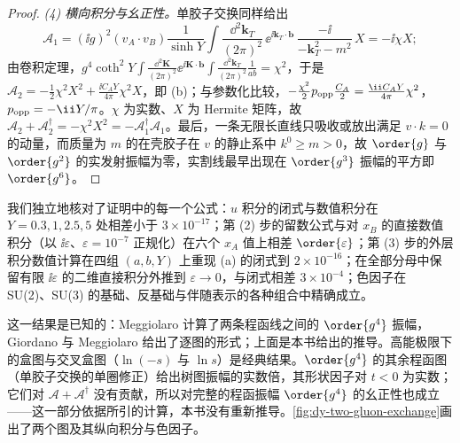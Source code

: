 \begin{proof}
\emph{(4) 横向积分与幺正性。}单胶子交换同样给出
\[
\mathcal A_1=(\ii g)^2(v_A\cdot v_B)\frac{1}{\sinh Y}\int\frac{\dd^2\mathbf k_T}{(2\pi)^2}\,\ee^{\ii\mathbf k_T\cdot\boldsymbol b}\,\frac{-\ii}{-\mathbf k_T^2-m^2}\,X=-\ii\chi X ;
\]
由卷积定理，$g^4\coth^2Y\int\frac{\dd^2\mathbf K}{(2\pi)^2}\ee^{\ii\mathbf K\cdot\boldsymbol b}\int\frac{\dd^2\mathbf k_T}{(2\pi)^2}\frac{1}{ab}=\chi^2$，于是 $\mathcal A_2=-\frac12\chi^2X^2+\frac{\ii C_AY}{4\pi}\chi^2X$，即 (b)；与参数化比较，$-\frac{\chi^2}{2}p_{\rm opp}\frac{C_A}{2}=\frac{\ii C_AY}{4\pi}\chi^2$，$p_{\rm opp}=-\ii Y/\pi$。$\chi$ 为实数、$X$ 为 Hermite 矩阵，故 $\mathcal A_2+\mathcal A_2^\dagger=-\chi^2X^2=-\mathcal A_1^\dagger\mathcal A_1$。最后，一条无限长直线只吸收或放出满足 $v\cdot k=0$ 的动量，而质量为 $m$ 的在壳胶子在 $v$ 的静止系中 $k^0\ge m>0$，故 $\order{g}$ 与 $\order{g^2}$ 的实发射振幅为零，实割线最早出现在 $\order{g^3}$ 振幅的平方即 $\order{g^6}$。
\end{proof}

我们独立地核对了证明中的每一个公式：$u$ 积分的闭式与数值积分在 $Y=0.3,1,2.5,5$ 处相差小于 $3\times10^{-17}$；第 (2) 步的留数公式与对 $x_B$ 的直接数值积分（以 $\ii\varepsilon$、$\varepsilon=10^{-7}$ 正规化）在六个 $x_A$ 值上相差 $\order{\varepsilon}$；第 (3) 步的外层积分数值计算在四组 $(a,b,Y)$ 上重现 (a) 的闭式到 $2\times10^{-16}$；在全部分母中保留有限 $\ii\varepsilon$ 的二维直接积分外推到 $\varepsilon\to0$，与闭式相差 $3\times10^{-4}$；色因子在 SU(2)、SU(3) 的基础、反基础与伴随表示的各种组合中精确成立。

这一结果是已知的：Meggiolaro 计算了两条程函线之间的 $\order{g^4}$ 振幅\cite[第~3~节，式~(3.23)--(3.26)、(3.34)、(3.36)]{Meggiolaro:1996hf}，Giordano 与 Meggiolaro 给出了逐图的形式\cite[式~(4.24)]{Giordano:2006vv}；上面是本书给出的推导。高能极限下的盒图与交叉盒图（$\ln(-s)$ 与 $\ln s$）是经典结果\cite{Cheng:1969eh,Korchemskaya:1994qp,Korchemsky:1993hr,Caron-Huot:2013fea}。$\order{g^4}$ 的其余程函图（单胶子交换的单圈修正）给出树图振幅的实数倍，其形状因子对 $t<0$ 为实数\cite[式~(3.28)--(3.34)]{Meggiolaro:1996hf}；它们对 $\mathcal A+\mathcal A^\dagger$ 没有贡献，所以对完整的程函振幅 $\order{g^4}$ 的幺正性也成立——这一部分依据所引的计算，本书没有重新推导。\cref{fig:dy-two-gluon-exchange}画出了两个图及其纵向积分与色因子。


